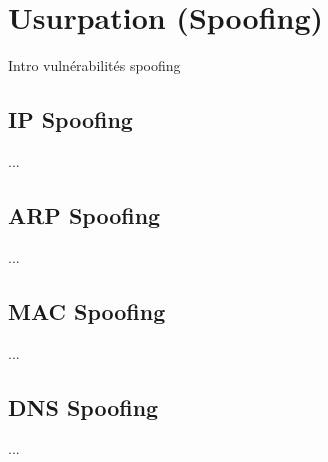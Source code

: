 

\newpage
\section{Usurpation (Spoofing)}\label{vulnerabilites:reseau:spoofing}

Intro vulnérabilités spoofing

\subsection{IP Spoofing}\label{vulnerabilites:reseau:spoofing:ip}

...

\subsection{ARP Spoofing}\label{vulnerabilites:reseau:spoofing:arp}

...

\subsection{MAC Spoofing}\label{vulnerabilites:reseau:spoofing:mac}

...

\subsection{DNS Spoofing}\label{vulnerabilites:reseau:spoofing:dns}

...

\endinput

